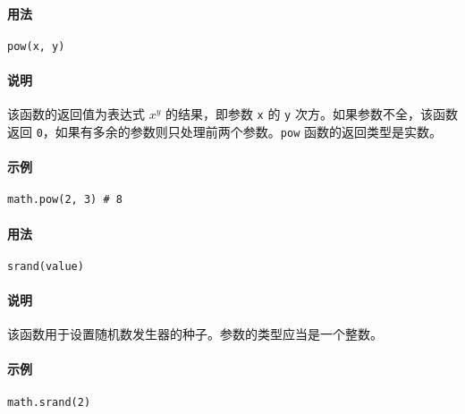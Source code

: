 
\paragraph{用法}
\begin{lstlisting}[language=berry, numbers=none]
pow(x, y)
\end{lstlisting}

\paragraph{说明}
该函数的返回值为表达式 $x^y$ 的结果，即参数 \texttt{x} 的 \texttt{y} 次方。如果参数不全，该函数返回 \texttt{0}，如果有多余的参数则只处理前两个参数。\texttt{pow} 函数的返回类型是实数。

\paragraph{示例}
\begin{lstlisting}[language=berry, numbers=none]
math.pow(2, 3) # 8
\end{lstlisting}


\paragraph{用法}
\begin{lstlisting}[language=berry, numbers=none]
srand(value)
\end{lstlisting}

\paragraph{说明}
该函数用于设置随机数发生器的种子。参数的类型应当是一个整数。

\paragraph{示例}
\begin{lstlisting}[language=berry, numbers=none]
math.srand(2)
\end{lstlisting}


